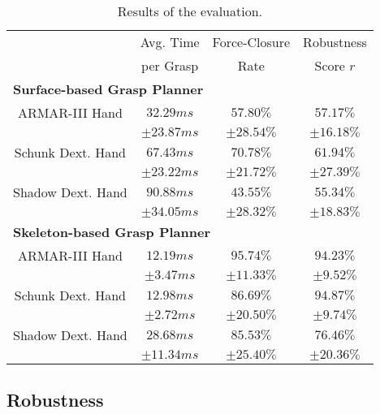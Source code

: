 \begin{table}[h!]%
\begin{center}
\begin{tabular}{ |c|c|c|c| } 
 \hline
												& Avg. Time & Force-Closure & Robustness \\ 
												& per Grasp & Rate 			& Score $r$\\ 
 \hline
\multicolumn{4}{|l|}{\textbf{Surface-based Grasp Planner}}\\
 \hline
 ARMAR-III Hand 			& $32.29ms$ 		& $57.80\%$  	& $57.17\%$\\   %
							& $\pm 23.87ms$ 	& $\pm 28.54\%$ & $\pm 16.18\%$\\
 Schunk Dext. Hand 			& $67.43ms$ 		& $70.78\%$  	& $61.94\%$\\   %
							& $\pm 23.22ms$ 	& $\pm 21.72\%$ & $\pm 27.39\%$\\
 Shadow Dext. Hand 			& $90.88ms$ 		& $43.55\%$  	& $55.34\%$\\   %
							& $\pm 34.05ms$ 	& $\pm 28.32\%$ & $\pm 18.83\%$\\
 \hline
\multicolumn{4}{|l|}{\textbf{Skeleton-based Grasp Planner}}\\
 \hline
 ARMAR-III Hand 			& $12.19ms$ 		& $95.74\%$  	& $94.23\%$\\   %
							& $\pm 3.47ms$ 		& $\pm 11.33\%$ & $\pm 9.52\%$\\
 Schunk Dext. Hand 			& $12.98ms$ 		& $86.69\%$  	& $94.87\%$\\   %
							& $\pm 2.72ms$ 		& $\pm 20.50\%$ & $\pm 9.74\%$\\
 Shadow Dext. Hand 			& $28.68ms$ 		& $85.53\%$  	& $76.46\%$\\   %
							& $\pm 11.34ms$ 	& $\pm 25.40\%$ & $\pm 20.36\%$\\
\hline
\end{tabular}
\caption{Results of the evaluation.}
\label{tab:eval-time-fc}%
\end{center}
\end{table}
\vspace{-1cm}
\subsection{Robustness}

